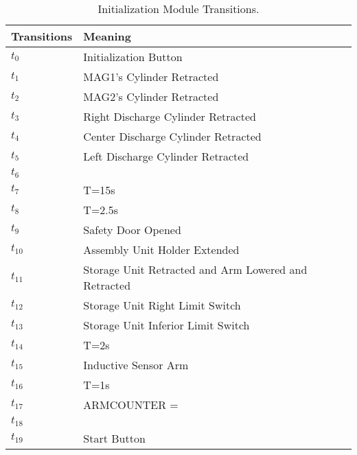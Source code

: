 \begin{table}[H]
\caption{Initialization Module Transitions.}
\centering
\begin{tabular}{M{5cm}M{10cm}}
Transitions & Meaning\\
\hline
\hyperlink{partialNet:t0}{\hypertarget{partialTable:t0}{$t_{0}$}} & Initialization Button\\
\hyperlink{partialNet:t1}{\hypertarget{partialTable:t1}{$t_{1}$}} & MAG1's Cylinder Retracted\\
\hyperlink{partialNet:t2}{\hypertarget{partialTable:t2}{$t_{2}$}} & MAG2's Cylinder Retracted\\
\hyperlink{partialNet:t3}{\hypertarget{partialTable:t3}{$t_{3}$}} & Right Discharge Cylinder Retracted\\
\hyperlink{partialNet:t4}{\hypertarget{partialTable:t4}{$t_{4}$}} & Center Discharge Cylinder Retracted\\
\hyperlink{partialNet:t5}{\hypertarget{partialTable:t5}{$t_{5}$}} & Left Discharge Cylinder Retracted\\
\hyperlink{partialNet:t6}{\hypertarget{partialTable:t6}{$t_{6}$}} & \\
\hyperlink{partialNet:tt7}{\hypertarget{partialTable:tt7}{$t_{7}$}} & T=15s\\
\hyperlink{partialNet:tt8}{\hypertarget{partialTable:tt8}{$t_{8}$}} & T=2.5s\\
\hyperlink{partialNet:t9}{\hypertarget{partialTable:t9}{$t_{9}$}} & Safety Door Opened\\
\hyperlink{partialNet:t10}{\hypertarget{partialTable:t10}{$t_{10}$}} & Assembly Unit Holder Extended\\
\hyperlink{partialNet:t11}{\hypertarget{partialTable:t11}{$t_{11}$}} & Storage Unit Retracted and Arm Lowered and Retracted\\
\hyperlink{partialNet:t12}{\hypertarget{partialTable:t12}{$t_{12}$}} & Storage Unit Right Limit Switch\\
\hyperlink{partialNet:t13}{\hypertarget{partialTable:t13}{$t_{13}$}} & Storage Unit Inferior Limit Switch\\
\hyperlink{partialNet:tt14}{\hypertarget{partialTable:tt14}{$t_{14}$}} & T=2s\\
\hyperlink{partialNet:t15}{\hypertarget{partialTable:t15}{$t_{15}$}} & Inductive Sensor Arm\\
\hyperlink{partialNet:tt16}{\hypertarget{partialTable:tt16}{$t_{16}$}} & T=1s\\
\hyperlink{partialNet:t17}{\hypertarget{partialTable:t17}{$t_{17}$}} & ARMCOUNTER = \\
\hyperlink{partialNet:t18}{\hypertarget{partialTable:t18}{$t_{18}$}} & \\
\hyperlink{partialNet:t19}{\hypertarget{partialTable:t19}{$t_{19}$}} & Start Button\\
\end{tabular}
\end{table}
